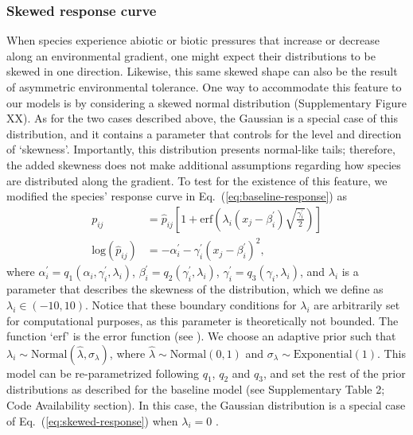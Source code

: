 \documentclass[11pt, a4paper]{article}
\begin{document}
\subsubsection*{Skewed response curve}
When species experience abiotic or biotic pressures that increase or decrease along an environmental gradient, one might expect their distributions to be skewed in one direction. Likewise, this same skewed shape can also be the result of asymmetric environmental tolerance. One way to accommodate this feature to our models is by considering a skewed normal distribution (Supplementary Figure XX). As for the two cases described above, the Gaussian is a special case of this distribution, and it contains a parameter that controls for the level and direction of `skewness'. Importantly, this distribution presents normal-like tails; therefore, the added skewness does not make additional assumptions regarding how species are distributed along the gradient. To test for the existence of this feature, we modified the species' response curve in Eq.~(\ref{eq:baseline-response}) as
\begin{equation}
\begin{split}
p_{ij} & =\hat{p}_{ij} \left[1+\text{erf}\left(\lambda_{i}\left(x_{j}-\beta^{\prime}_{i}\right)\sqrt{\frac{\gamma^{\prime}_{i}}{2}}\right)\right] \\
\text{log}\left(\hat{p}_{ij}\right) & = -\alpha^{\prime}_{i} - \gamma^{\prime}_{i} \left(x_{j}-\beta^{\prime}_{i}\right)^2 ,
\end{split}
\label{eq:skewed-response}
\end{equation}
where $\alpha^{\prime}_{i} = q_{1}\left(\alpha_{i}, \gamma^{\prime}_{i}, \lambda_{i}\right)$, $\beta^{\prime}_{i} = q_{2}\left(\gamma^{\prime}_{i}, \lambda_{i}\right)$, $\gamma^{\prime}_{i} = q_{3}\left(\gamma_{i}, \lambda_{i}\right)$, and $\lambda_{i}$ is a parameter that describes the skewness of the distribution, which we define as $\lambda_{i}\in\left(-10, 10\right)$. Notice that these boundary conditions for $\lambda_{i}$ are arbitrarily set for computational purposes, as this parameter is theoretically not bounded. The function `erf' is the error function (see \citealt{ashourApproximateSkewNormal2010}). We choose an adaptive prior such that $\lambda_{i}\sim \text{Normal}\left(\hat{\lambda}, \sigma_{\lambda}\right)$, where $\hat{\lambda}\sim\text{Normal}\left(0, 1\right)$ and $\sigma_{\lambda}\sim\text{Exponential}\left(1\right)$. This model can be re-parametrized following $q_1$, $q_2$ and $q_3$, and set the rest of the prior distributions as described for the baseline model (see Supplementary Table 2; Code Availability section). In this case, the Gaussian distribution is a special case of Eq.~(\ref{eq:skewed-response}) when $\lambda_{i}=0$ \citep{ashourApproximateSkewNormal2010}.
\end{document}
